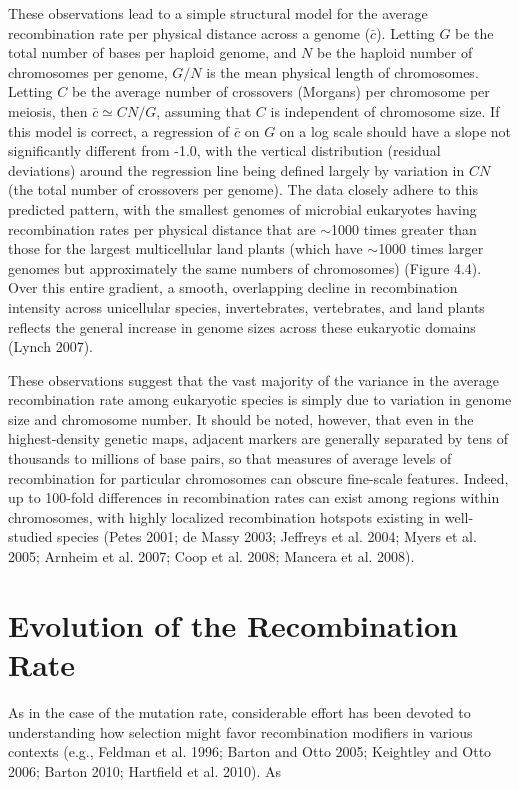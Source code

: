 \documentclass{article}
\begin{document}
These observations lead to a simple structural model for the average recombination rate per physical distance across a genome ($\bar{c}$). Letting $G$ be the total number of bases per haploid genome, and $N$ be the haploid number of chromosomes per genome, $G/N$ is the mean physical length of chromosomes. Letting $C$ be the average number of crossovers (Morgans) per chromosome per meiosis, then $\bar{c} \simeq CN/G$, assuming that $C$ is independent of chromosome size. If this model is correct, a regression of $\bar{c}$ on $G$ on a log scale should have a slope not significantly different from -1.0, with the vertical distribution (residual deviations) around the regression line being defined largely by variation in $CN$ (the total number of crossovers per genome). The data closely adhere to this predicted pattern, with the smallest genomes of microbial eukaryotes having recombination rates per physical distance that are $\sim$1000 times greater than those for the largest multicellular land plants (which have $\sim$1000 times larger genomes but approximately the same numbers of chromosomes) (Figure 4.4). Over this entire gradient, a smooth, overlapping decline in recombination intensity across unicellular species, invertebrates, vertebrates, and land plants reflects the general increase in genome sizes across these eukaryotic domains (Lynch 2007).

These observations suggest that the vast majority of the variance in the average recombination rate among eukaryotic species is simply due to variation in genome size and chromosome number. It should be noted, however, that even in the highest-density genetic maps, adjacent markers are generally separated by tens of thousands to millions of base pairs, so that measures of average levels of recombination for particular chromosomes can obscure fine-scale features. Indeed, up to 100-fold differences in recombination rates can exist among regions within chromosomes, with highly localized recombination hotspots existing in well-studied species (Petes 2001; de Massy 2003; Jeffreys et al. 2004; Myers et al. 2005; Arnheim et al. 2007; Coop et al. 2008; Mancera et al. 2008).

\section{Evolution of the Recombination Rate}
As in the case of the mutation rate, considerable effort has been devoted to understanding how selection might favor recombination modifiers in various contexts (e.g., Feldman et al. 1996; Barton and Otto 2005; Keightley and Otto 2006; Barton 2010; Hartfield et al. 2010). As
\end{document}
